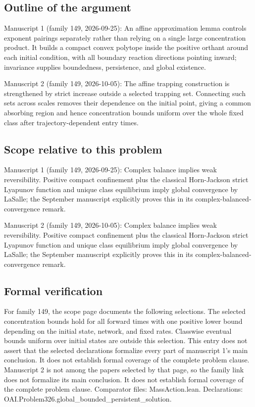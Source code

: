\documentclass[11pt]{article}
\begin{document}
\subsection{Outline of the argument}
Manuscript 1 (family 149, 2026-09-25): An affine approximation lemma controls exponent pairings separately rather than relying on a single large concentration product. It builds a compact convex polytope inside the positive orthant around each initial condition, with all boundary reaction directions pointing inward; invariance supplies boundedness, persistence, and global existence.

Manuscript 2 (family 149, 2026-10-05): The affine trapping construction is strengthened by strict increase outside a selected trapping set. Connecting such sets across scales removes their dependence on the initial point, giving a common absorbing region and hence concentration bounds uniform over the whole fixed class after trajectory-dependent entry times.

\subsection{Scope relative to this problem}
Manuscript 1 (family 149, 2026-09-25): Complex balance implies weak reversibility. Positive compact confinement plus the classical Horn-Jackson strict Lyapunov function and unique class equilibrium imply global convergence by LaSalle; the September manuscript explicitly proves this in its complex-balanced-convergence remark.

Manuscript 2 (family 149, 2026-10-05): Complex balance implies weak reversibility. Positive compact confinement plus the classical Horn-Jackson strict Lyapunov function and unique class equilibrium imply global convergence by LaSalle; the September manuscript explicitly proves this in its complex-balanced-convergence remark.

\subsection{Formal verification}
For family 149, the scope page documents the following selections. The selected concentration bounds hold for all forward times with one positive lower bound depending on the initial state, network, and fixed rates. Classwise eventual bounds uniform over initial states are outside this selection. This entry does not assert that the selected declarations formalize every part of manuscript 1's main conclusion. It does not establish formal coverage of the complete problem clause. Manuscript 2 is not among the papers selected by that page, so the family link does not formalize its main conclusion. It does not establish formal coverage of the complete problem clause. Comparator files: MassAction.lean. Declarations: OAI.Problem326.global\_bounded\_persistent\_solution.
\end{document}
